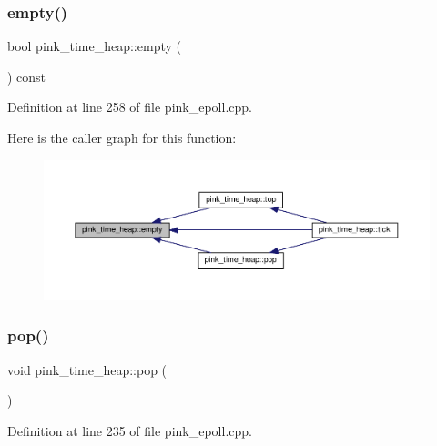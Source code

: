 \subsubsection{\texorpdfstring{empty()}{empty()}}
{\footnotesize\ttfamily bool pink\+\_\+time\+\_\+heap\+::empty (\begin{DoxyParamCaption}{ }\end{DoxyParamCaption}) const}



Definition at line 258 of file pink\+\_\+epoll.\+cpp.

Here is the caller graph for this function\+:\nopagebreak
\begin{figure}[H]
\begin{center}
\leavevmode
\includegraphics[width=350pt]{classpink__time__heap_ade64cf32193747380cb57c5709e28383_icgraph}
\end{center}
\end{figure}
\mbox{\label{classpink__time__heap_a5642ee3340cdee7983ed63770e7109d1}} 
\subsubsection{\texorpdfstring{pop()}{pop()}}
{\footnotesize\ttfamily void pink\+\_\+time\+\_\+heap\+::pop (\begin{DoxyParamCaption}{ }\end{DoxyParamCaption})}



Definition at line 235 of file pink\+\_\+epoll.\+cpp.

